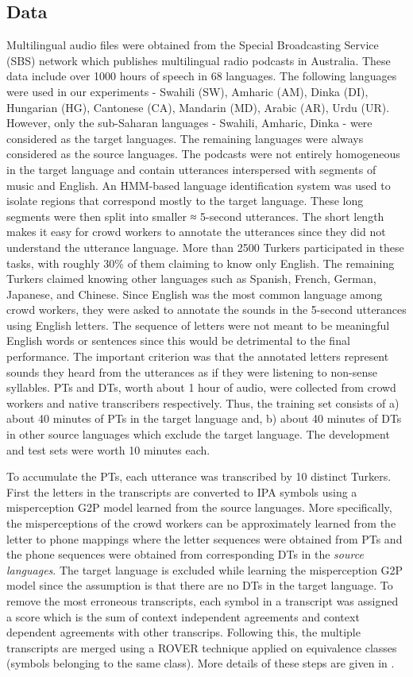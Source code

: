 \documentclass[a4paper]{article}
\begin{document}
\subsection{Data} \vspace{-1mm}
Multilingual audio files were obtained from the Special Broadcasting Service (SBS) network which publishes multilingual radio podcasts in Australia. These data include over 1000 hours of speech in 68 languages.
The following languages were used in our experiments - Swahili (SW), Amharic (AM), Dinka (DI), Hungarian (HG), Cantonese (CA), Mandarin (MD), Arabic (AR), Urdu (UR). However, only the sub-Saharan languages - Swahili, Amharic, Dinka - were considered as the target languages. The remaining languages were always considered as the source languages. The podcasts were not entirely homogeneous in the target language and contain utterances interspersed with segments of music and English. An HMM-based language identification system was used to isolate regions that correspond mostly to the target language. These long segments were then split into smaller ≈ 5-second utterances. The short length makes it easy for crowd workers to annotate the utterances since they did not understand the utterance language. More than 2500 Turkers participated in these tasks, with roughly 30\% of them claiming to know only English. The remaining Turkers claimed knowing other languages such as Spanish, French, German, Japanese, and Chinese. Since English was the most common language among crowd workers, they were asked to annotate the sounds in the 5-second utterances using English letters. The sequence of letters were not meant to be meaningful English words or sentences since this would be detrimental to the final performance. The important criterion was that the annotated letters represent sounds they heard from the utterances as if they were listening to non-sense syllables. PTs and DTs, worth about 1 hour of audio, were collected from crowd workers and native transcribers respectively. Thus, the training set consists of a) about 40 minutes of PTs in the target language and, b) about 40 minutes of DTs in other source languages which exclude the target language. The development and test sets were worth 10 minutes each. 

To accumulate the PTs, each utterance was transcribed by 10 distinct Turkers. First the letters in the transcripts are converted to IPA symbols using a misperception G2P model learned from the source languages. More specifically, the misperceptions of the crowd workers can be approximately learned from the letter to phone mappings where the letter sequences were obtained from PTs and the phone sequences were obtained from corresponding DTs in the \emph{source languages}. The target language is excluded while learning the misperception G2P model since the assumption is that there are no DTs in the target language. To remove the most erroneous transcripts, each symbol in a transcript was assigned a score which is the sum of context independent agreements and context dependent agreements with other transcrips. Following this, the multiple transcripts are merged using a ROVER technique applied on equivalence classes (symbols belonging to the same class). More details of these steps are given in \cite{Jyothi-MismatchedCrowdsourcingTrans}. 
\end{document}
